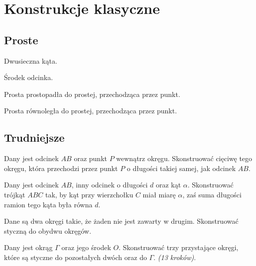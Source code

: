 %

\section{Konstrukcje klasyczne}
\subsection{Proste}
\begin{problem}
    Dwusieczna kąta.
\end{problem}

\begin{problem}
    Środek odcinka.
\end{problem}

\begin{problem}
    Prosta prostopadła do prostej, przechodząca przez punkt.
\end{problem}

\begin{problem}
    Prosta równoległa do prostej, przechodząca przez punkt.
\end{problem}





\subsection{Trudniejsze}


\begin{problem}
    Dany jest odcinek $AB$ oraz punkt $P$ wewnątrz okręgu.
    Skonstruować cięciwę tego okręgu, która przechodzi przez punkt $P$ o długości takiej samej, jak odcinek $AB$.
\end{problem}

\begin{problem}
    Dany jest odcinek $AB$, inny odcinek o długości $d$ oraz kąt $\alpha$.
    Skonstruować trójkąt $ABC$ tak, by kąt przy wierzchołku $C$ miał miarę $\alpha$, zaś suma długości ramion tego kąta była równa $d$.
\end{problem}

\begin{problem}
    Dane są dwa okręgi takie, że żaden nie jest zawarty w drugim.
    Skonstruować styczną do obydwu okręgów.
\end{problem}

\begin{problem}
    Dany jest okrąg $\Gamma$ oraz jego środek $O$.
    Skonstruować trzy przystające okręgi, które są styczne do pozostałych dwóch oraz do $\Gamma$. \hfill \emph{(13 kroków)}. %
\end{problem}

